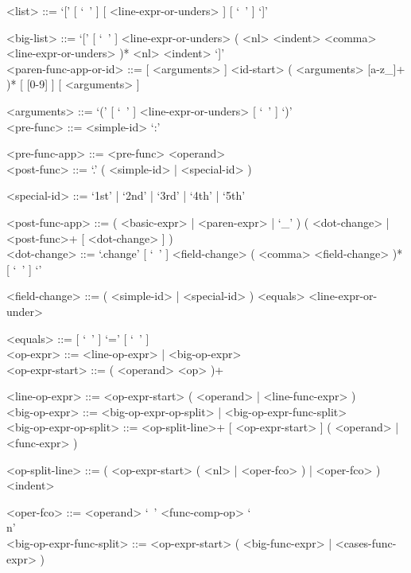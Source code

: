 \documentclass{article}
\begin{document}
\begin{grammar}
<list> ::= `[' [ `\ ' ] [ <line-expr-or-unders> ] [ `\ ' ] `]'

<big-list> ::=
`[' [ `\ ' ] <line-expr-or-unders>
( <nl> <indent> <comma> <line-expr-or-unders> )* <nl> <indent> `]'
\\

<paren-func-app-or-id> ::=
[ <arguments> ] <id-start> ( <arguments> [a-z_]+ )* [ [0-9] ]
[ <arguments> ]

<arguments> ::= `(' [ `\ ' ] <line-expr-or-unders> [ `\ ' ] `)'
\\

\newpage
<pre-func> ::= <simple-id> `:'

<pre-func-app> ::= <pre-func> <operand>
\\

<post-func> ::= `.' ( <simple-id> | <special-id> )

<special-id> ::= `1st' | `2nd' | `3rd' | `4th' | `5th'

<post-func-app> ::=
( <basic-expr> | <paren-expr> | `_' )
( <dot-change> | <post-func>+ [ <dot-change> ] )
\\

<dot-change> ::=
`.change{' [ `\ ' ] <field-change> ( <comma> <field-change> )* [ `\ ' ] `}'

<field-change> ::= ( <simple-id> | <special-id> ) <equals> <line-expr-or-under>

<equals> ::= [ `\ ' ] `=' [ `\ ' ]
\\

<op-expr> ::= <line-op-expr> | <big-op-expr>
\\

<op-expr-start> ::= ( <operand> <op> )+

<line-op-expr> ::= <op-expr-start> ( <operand> | <line-func-expr> )
\\

<big-op-expr> ::=
<big-op-expr-op-split> | <big-op-expr-func-split>
\\

<big-op-expr-op-split> ::=
<op-split-line>+ [ <op-expr-start> ] ( <operand> | <func-expr> )

<op-split-line> ::=
( <op-expr-start> ( <nl> | <oper-fco> ) | <oper-fco> ) <indent>

<oper-fco> ::= <operand> `\ ' <func-comp-op> `\\n'
\\

<big-op-expr-func-split> ::=
<op-expr-start> ( <big-func-expr> | <cases-func-expr> )
\\


\end{grammar}
\end{document}
